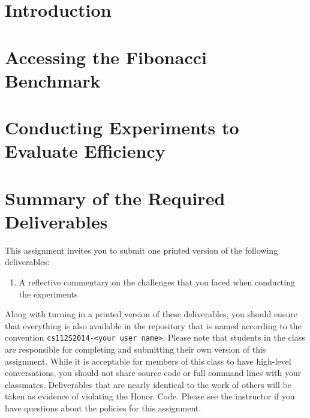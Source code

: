 


\usepackage[compact]{titlesec}


\section*{Introduction}

\section*{Accessing the Fibonacci Benchmark}

\section*{Conducting Experiments to Evaluate Efficiency}

\section*{Summary of the Required Deliverables}

  This assignment invites you to submit one printed version of the following deliverables: 

  \begin{enumerate} 
    
    \item A reflective commentary on the challenges that you faced when conducting the experiments
   
  \end{enumerate}

  Along with turning in a printed version of these deliverables, you should ensure that everything is also available in
  the repository that is named according to the convention {\tt cs112S2014-<your user name>}. Please note that students
  in the class are responsible for completing and submitting their own version of this assignment.    While it is
  acceptable for members of this class to have high-level conversations, you should not share source code or full
  command lines with your classmates.  Deliverables that are nearly identical to the work of others will be taken as
  evidence of violating the \mbox{Honor Code}.  Please see the instructor if you have questions about the policies for
  this assignment.

  
